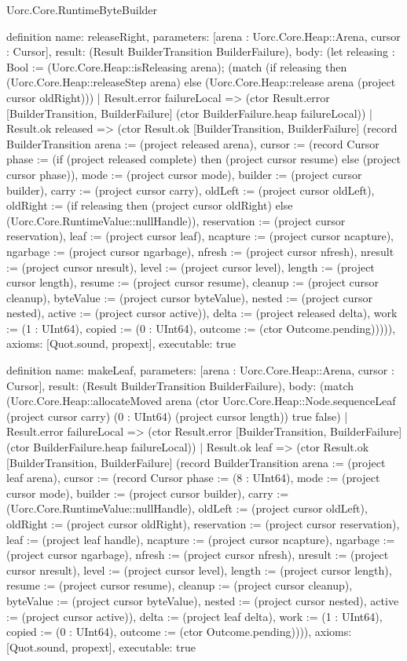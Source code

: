 \begin{lexlean}{Uorc.Core.RuntimeByteBuilder}
\begin{semanticmodule}
definition{
  name: releaseRight,
  parameters: [arena : Uorc.Core.Heap::Arena, cursor : Cursor],
  result: (Result BuilderTransition BuilderFailure),
  body: (let releasing : Bool := (Uorc.Core.Heap::isReleasing arena); (match (if releasing then (Uorc.Core.Heap::releaseStep arena) else (Uorc.Core.Heap::release arena (project cursor oldRight)))
    | Result.error failureLocal => (ctor Result.error [BuilderTransition, BuilderFailure] (ctor BuilderFailure.heap failureLocal))
    | Result.ok released => (ctor Result.ok [BuilderTransition, BuilderFailure] (record BuilderTransition {arena := (project released arena), cursor := (record Cursor {phase := (if (project released complete) then (project cursor resume) else (project cursor phase)), mode := (project cursor mode), builder := (project cursor builder), carry := (project cursor carry), oldLeft := (project cursor oldLeft), oldRight := (if releasing then (project cursor oldRight) else (Uorc.Core.RuntimeValue::nullHandle)), reservation := (project cursor reservation), leaf := (project cursor leaf), ncapture := (project cursor ncapture), ngarbage := (project cursor ngarbage), nfresh := (project cursor nfresh), nresult := (project cursor nresult), level := (project cursor level), length := (project cursor length), resume := (project cursor resume), cleanup := (project cursor cleanup), byteValue := (project cursor byteValue), nested := (project cursor nested), active := (project cursor active)}), delta := (project released delta), work := (1 : UInt64), copied := (0 : UInt64), outcome := (ctor Outcome.pending)})))),
  axioms: [Quot.sound, propext],
  executable: true
}

definition{
  name: makeLeaf,
  parameters: [arena : Uorc.Core.Heap::Arena, cursor : Cursor],
  result: (Result BuilderTransition BuilderFailure),
  body: (match (Uorc.Core.Heap::allocateMoved arena (ctor Uorc.Core.Heap::Node.sequenceLeaf (project cursor carry) (0 : UInt64) (project cursor length)) true false)
    | Result.error failureLocal => (ctor Result.error [BuilderTransition, BuilderFailure] (ctor BuilderFailure.heap failureLocal))
    | Result.ok leaf => (ctor Result.ok [BuilderTransition, BuilderFailure] (record BuilderTransition {arena := (project leaf arena), cursor := (record Cursor {phase := (8 : UInt64), mode := (project cursor mode), builder := (project cursor builder), carry := (Uorc.Core.RuntimeValue::nullHandle), oldLeft := (project cursor oldLeft), oldRight := (project cursor oldRight), reservation := (project cursor reservation), leaf := (project leaf handle), ncapture := (project cursor ncapture), ngarbage := (project cursor ngarbage), nfresh := (project cursor nfresh), nresult := (project cursor nresult), level := (project cursor level), length := (project cursor length), resume := (project cursor resume), cleanup := (project cursor cleanup), byteValue := (project cursor byteValue), nested := (project cursor nested), active := (project cursor active)}), delta := (project leaf delta), work := (1 : UInt64), copied := (0 : UInt64), outcome := (ctor Outcome.pending)}))),
  axioms: [Quot.sound, propext],
  executable: true
}


\end{semanticmodule}
\end{lexlean}
